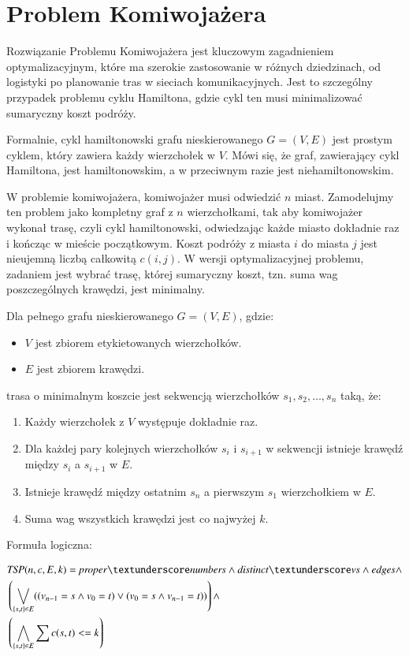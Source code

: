 \section{Problem Komiwojażera}
Rozwiązanie Problemu Komiwojażera jest kluczowym zagadnieniem optymalizacyjnym, które ma szerokie zastosowanie w różnych dziedzinach, od logistyki po planowanie tras w sieciach komunikacyjnych. Jest to szczególny przypadek problemu cyklu Hamiltona, gdzie cykl ten musi minimalizować sumaryczny koszt podróży. 

Formalnie, cykl hamiltonowski grafu nieskierowanego $G = (V, E)$ jest prostym cyklem, który zawiera każdy wierzchołek w \(V\). Mówi się, że graf, zawierający cykl Hamiltona, jest hamiltonowskim, a w przeciwnym razie jest niehamiltonowskim. 

W problemie komiwojażera, komiwojażer musi odwiedzić \(n\) miast. Zamodelujmy ten problem jako kompletny graf z \(n\) wierzchołkami, tak aby komiwojażer wykonał trasę, czyli cykl hamiltonowski, odwiedzając każde miasto dokładnie raz i kończąc w mieście początkowym. Koszt podróży z miasta \(i\) do miasta \(j\) jest nieujemną liczbą całkowitą \(c(i, j)\). W wersji optymalizacyjnej problemu, zadaniem jest wybrać trasę, której sumaryczny koszt, tzn. suma wag poszczególnych krawędzi, jest minimalny.

Dla pełnego grafu nieskierowanego $G = (V, E)$, gdzie:
\begin{itemize}
	\item \(V\) jest zbiorem etykietowanych wierzchołków.
	\item \(E\) jest zbiorem krawędzi.
\end{itemize}
trasa o minimalnym koszcie jest sekwencją wierzchołków $s_1, s_2, …, s_n$ taką, że:
\begin{enumerate}
	\item Każdy wierzchołek z \(V\) występuje dokładnie raz.
	\item Dla każdej pary kolejnych wierzchołków \(s_i\) i \(s_{i+1}\) w sekwencji istnieje krawędź między \(s_i\) a \(s_{i+1}\) w \(E\).
	\item Istnieje krawędź między ostatnim \(s_n\) a pierwszym \(s_1\) wierzchołkiem w \(E\).
	\item Suma wag wszystkich krawędzi jest co najwyżej \(k\).
\end{enumerate}

Formuła logiczna:

\begin{align*}
	&\TSP(n, c, E, k) = \propernumbers \land \distinctvs \land \edges \land \\
	&\left( \bigvee_{\{s,t\} \in E} ((v_{n-1} = s \land v_0 = t) \lor (v_0 = s \land v_{n-1} = t)) \right) \land \\
	&\left( \bigwedge_{\{s,t\} \in E} \sum c(s,t) <= k \right)
\end{align*}

